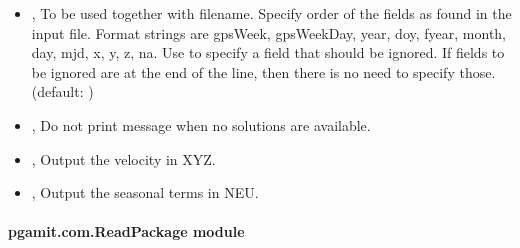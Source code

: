 \documentclass[letterpaper,10pt,english]{sphinxmanual}
\begin{document}
\begin{itemize}
\item {} 
\sphinxAtStartPar
{\hyperref[\detokenize{pgamit.com:QueryETM.py--format}]{}} , {\hyperref[\detokenize{pgamit.com:QueryETM.py---format}]{}}  \sphinxhyphen{} To be used together with \textendash{}filename. Specify order of the fields as found in the input file. Format strings are gpsWeek, gpsWeekDay, year, doy, fyear, month, day, mjd, x, y, z, na. Use  to specify a field that should be ignored. If fields to be ignored are at the end of the line, then there is no need to specify those. (default: )

\item {} 
\sphinxAtStartPar
{\hyperref[\detokenize{pgamit.com:QueryETM.py--quiet}]{}}, {\hyperref[\detokenize{pgamit.com:QueryETM.py---quiet}]{}} \sphinxhyphen{} Do not print message when no solutions are available.

\item {} 
\sphinxAtStartPar
{\hyperref[\detokenize{pgamit.com:QueryETM.py--vel}]{}}, {\hyperref[\detokenize{pgamit.com:QueryETM.py---velocity}]{}} \sphinxhyphen{} Output the velocity in XYZ.

\item {} 
\sphinxAtStartPar
{\hyperref[\detokenize{pgamit.com:QueryETM.py--seasonal}]{}}, {\hyperref[\detokenize{pgamit.com:QueryETM.py---seasonal_terms}]{}} \sphinxhyphen{} Output the seasonal terms in NEU.

\end{itemize}


\paragraph{pgamit.com.ReadPackage module}
\label{\detokenize{pgamit.com:module-pgamit.com.ReadPackage}}\label{\detokenize{pgamit.com:pgamit-com-readpackage-module}}
\end{document}
